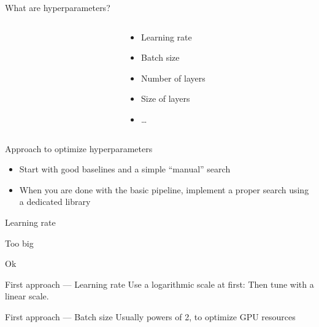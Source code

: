 \begin{frame}{What are hyperparameters?}
  \begin{columns}
    \begin{column}[c]{0.5\textwidth}
    \end{column}
    \begin{column}[c]{0.5\textwidth}
      \begin{itemize}
        \item Learning rate
        \item Batch size
        \item Number of layers
        \item Size of layers
        \item …
      \end{itemize}
    \end{column}
  \end{columns}
\end{frame}

\begin{frame}{Approach to optimize hyperparameters}
  \begin{itemize}
    \item Start with good baselines and a simple “manual” search
    \item When you are done with the basic pipeline, implement a proper search using a dedicated library
  \end{itemize}
\end{frame}

\begin{frame}{Learning rate}
  \begin{minipage}{0.49\textwidth}
    \centering
    Too big
  \end{minipage}\hfill
  \begin{minipage}{0.49\linewidth}
    \centering
    Ok
  \end{minipage}\hfill

\end{frame}

\begin{frame}{First approach --- Learning rate}
  Use a logarithmic scale at first:
  Then tune with a linear scale.
\end{frame}

\begin{frame}{First approach --- Batch size}
  Usually powers of 2, to optimize GPU resources
\end{frame}

